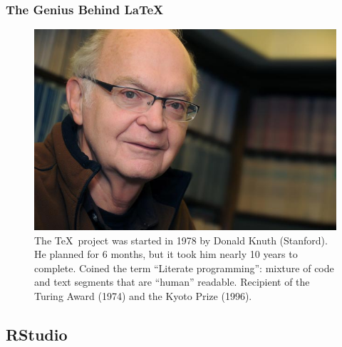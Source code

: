 \documentclass[10pt]{beamer}\usepackage[]{graphicx}\usepackage[]{color}
\begin{document}

\begin{frame}\frametitle{The Genius Behind \LaTeX}

\begin{figure}[h!]
\centering
\includegraphics[scale=0.4, keepaspectratio]{./don}
\small
\caption{The \TeX~project was started in 1978 by Donald Knuth (Stanford). He planned for 6 months, but it took him nearly 10 years to complete. Coined the term ``Literate programming'': mixture of code and text segments that are ``human'' readable. Recipient of the Turing Award (1974) and the Kyoto Prize (1996).}
\label{fig:don}
\end{figure}

\end{frame}



\subsection{RStudio}
\end{document}

